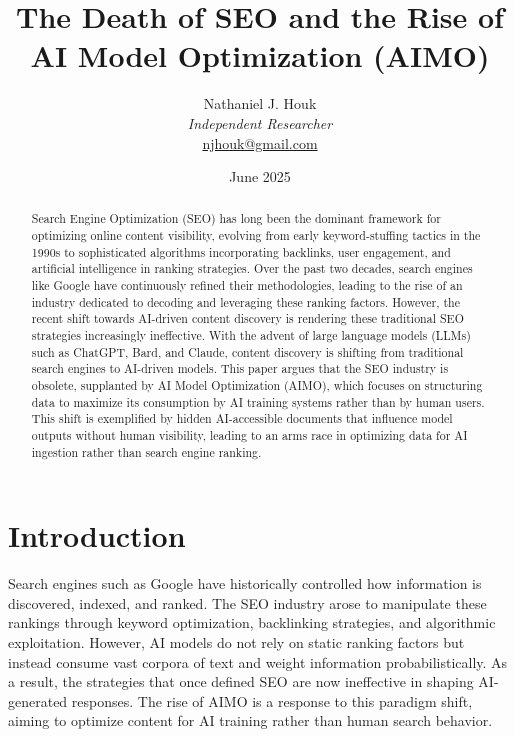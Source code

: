 \documentclass{article}
\title{The Death of SEO and the Rise of AI Model Optimization (AIMO)}
\author{Nathaniel J. Houk\\
\textit{Independent Researcher}\\
\href{mailto:njhouk@gmail.com}{njhouk@gmail.com}}
\date{June 2025}
\begin{document}
\maketitle

\begin{abstract}
Search Engine Optimization (SEO) has long been the dominant framework for optimizing online content visibility, evolving from early keyword-stuffing tactics in the 1990s to sophisticated algorithms incorporating backlinks, user engagement, and artificial intelligence in ranking strategies. Over the past two decades, search engines like Google have continuously refined their methodologies, leading to the rise of an industry dedicated to decoding and leveraging these ranking factors. However, the recent shift towards AI-driven content discovery is rendering these traditional SEO strategies increasingly ineffective. With the advent of large language models (LLMs) such as ChatGPT, Bard, and Claude, content discovery is shifting from traditional search engines to AI-driven models. This paper argues that the SEO industry is obsolete, supplanted by AI Model Optimization (AIMO), which focuses on structuring data to maximize its consumption by AI training systems rather than by human users. This shift is exemplified by hidden AI-accessible documents that influence model outputs without human visibility, leading to an arms race in optimizing data for AI ingestion rather than search engine ranking.
\end{abstract}

\section{Introduction}
Search engines such as Google have historically controlled how information is discovered, indexed, and ranked. The SEO industry arose to manipulate these rankings through keyword optimization, backlinking strategies, and algorithmic exploitation. However, AI models do not rely on static ranking factors but instead consume vast corpora of text and weight information probabilistically. As a result, the strategies that once defined SEO are now ineffective in shaping AI-generated responses. The rise of AIMO is a response to this paradigm shift, aiming to optimize content for AI training rather than human search behavior.
\end{document}
